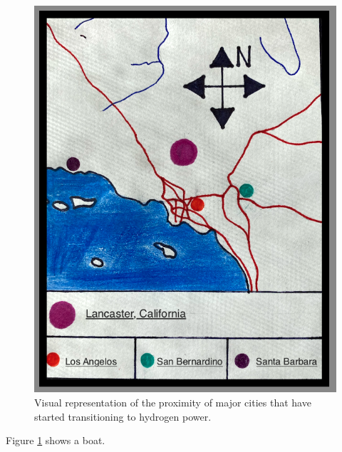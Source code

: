 \documentclass{article}
\begin{document}
\begin{figure}
    \includegraphics[width=\linewidth]{handDrawnMap.png}
    \caption{Visual representation of the proximity of major cities that have started transitioning to hydrogen power.}
    \label{fig:hydrogen}
\end{figure}


Figure \ref{fig:hydrogen} shows a boat.
\end{document}
